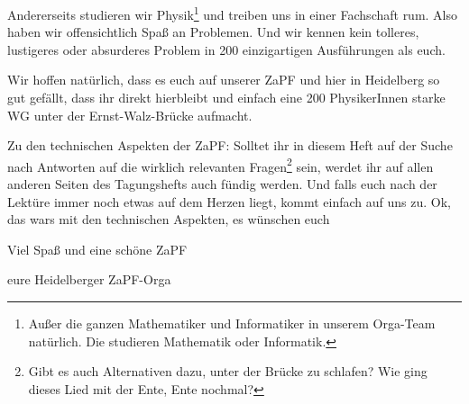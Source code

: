 Andererseits studieren wir Physik\footnote{Außer die ganzen Mathematiker und Informatiker in unserem Orga-Team natürlich. Die studieren Mathematik oder Informatik.} und treiben uns in einer Fachschaft rum. Also haben wir offensichtlich Spaß an Problemen. Und wir kennen kein tolleres, lustigeres oder absurderes Problem in 200 einzigartigen Ausführungen als euch.

Wir hoffen natürlich, dass es euch auf unserer ZaPF und hier in Heidelberg so gut gefällt, dass ihr direkt hierbleibt und einfach eine 200 PhysikerInnen starke WG unter der Ernst-Walz-Brücke aufmacht.

Zu den technischen Aspekten der ZaPF: Solltet ihr in diesem Heft auf der Suche nach Antworten auf die wirklich relevanten Fragen\footnote{Gibt es auch Alternativen dazu, unter der Brücke zu schlafen? Wie ging dieses Lied mit der Ente, Ente nochmal?} sein, werdet ihr auf allen anderen Seiten des Tagungshefts auch fündig werden. Und falls euch nach der Lektüre immer noch etwas auf dem Herzen liegt, kommt einfach auf uns zu. Ok, das wars mit den technischen Aspekten, es wünschen euch

Viel Spaß und eine schöne ZaPF

eure Heidelberger ZaPF-Orga
